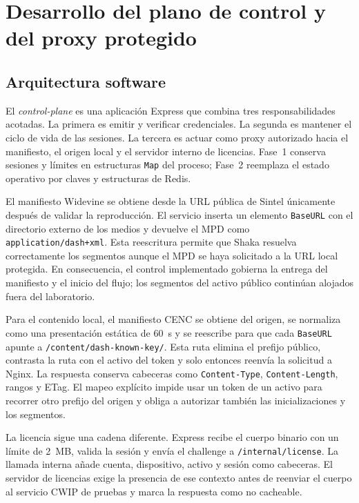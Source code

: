 \section{Desarrollo del plano de control y del proxy protegido}

\subsection{Arquitectura software}

El \textit{control-plane} es una aplicación Express que combina tres responsabilidades acotadas. La primera es emitir y verificar credenciales. La segunda es mantener el ciclo de vida de las sesiones. La tercera es actuar como proxy autorizado hacia el manifiesto, el origen local y el servidor interno de licencias. Fase~1 conserva sesiones y límites en estructuras \nolinkurl{Map} del proceso; Fase~2 reemplaza el estado operativo por claves y estructuras de Redis.

El manifiesto Widevine se obtiene desde la URL pública de Sintel únicamente después de validar la reproducción. El servicio inserta un elemento \nolinkurl{BaseURL} con el directorio externo de los medios y devuelve el MPD como \nolinkurl{application/dash+xml}. Esta reescritura permite que Shaka resuelva correctamente los segmentos aunque el MPD se haya solicitado a la URL local protegida. En consecuencia, el control implementado gobierna la entrega del manifiesto y el inicio del flujo; los segmentos del activo público continúan alojados fuera del laboratorio.

Para el contenido local, el manifiesto CENC se obtiene del origen, se normaliza como una presentación estática de 60~s y se reescribe para que cada \nolinkurl{BaseURL} apunte a \nolinkurl{/content/dash-known-key/}. Esta ruta elimina el prefijo público, contrasta la ruta con el activo del token y solo entonces reenvía la solicitud a Nginx. La respuesta conserva cabeceras como \nolinkurl{Content-Type}, \nolinkurl{Content-Length}, rangos y ETag. El mapeo explícito impide usar un token de un activo para recorrer otro prefijo del origen y obliga a autorizar también las inicializaciones y los segmentos.

La licencia sigue una cadena diferente. Express recibe el cuerpo binario con un límite de 2~MB, valida la sesión y envía el challenge a \nolinkurl{/internal/license}. La llamada interna añade cuenta, dispositivo, activo y sesión como cabeceras. El servidor de licencias exige la presencia de ese contexto antes de reenviar el cuerpo al servicio CWIP de pruebas y marca la respuesta como no cacheable.

